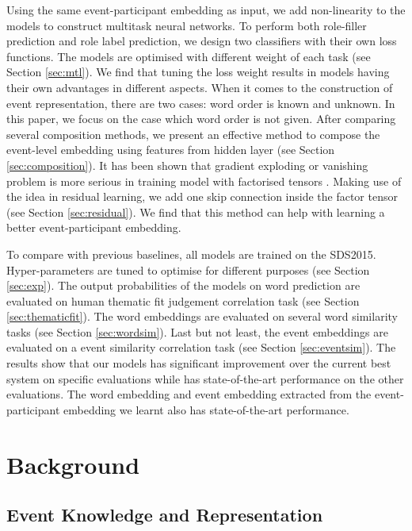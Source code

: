 \documentclass[a4paper]{article}
\begin{document}
Using the same event-participant embedding as input, we add non-linearity to the models to construct multitask neural networks. To perform both role-filler prediction and role label prediction, we design two classifiers with their own loss functions. The models are optimised with different weight of each task (see Section \ref{sec:mtl}). We find that tuning the loss weight results in models having their own advantages in different aspects. When it comes to the construction of event representation, there are two cases: word order is known and unknown. In this paper, we focus on the case which word order is not given. After comparing several composition methods, we present an effective method to compose the event-level embedding using features from hidden layer (see Section \ref{sec:composition}). It has been shown that gradient exploding or vanishing problem is more serious in training model with factorised tensors \citep{sutskever2011generating}.  Making use of the idea in residual learning, we add one skip connection inside the factor tensor (see Section \ref{sec:residual}). We find that this method can help with learning a better event-participant embedding.

To compare with previous baselines, all models are trained on the SDS2015. Hyper-parameters are tuned to optimise for different purposes (see Section \ref{sec:exp}). The output probabilities of the models on word prediction are evaluated on human thematic fit judgement correlation task (see Section \ref{sec:thematicfit}). The word embeddings are evaluated on several word similarity tasks (see Section \ref{sec:wordsim}). Last but not least, the event embeddings are evaluated on a event similarity correlation task (see Section \ref{sec:eventsim}). The results show that our models has significant improvement over the current best system on specific evaluations while has state-of-the-art performance on the other evaluations. The word embedding and event embedding extracted from the event-participant embedding we learnt also has state-of-the-art performance. 



\section{Background}
\subsection{Event Knowledge and Representation} \label{sec:event}
\end{document}
